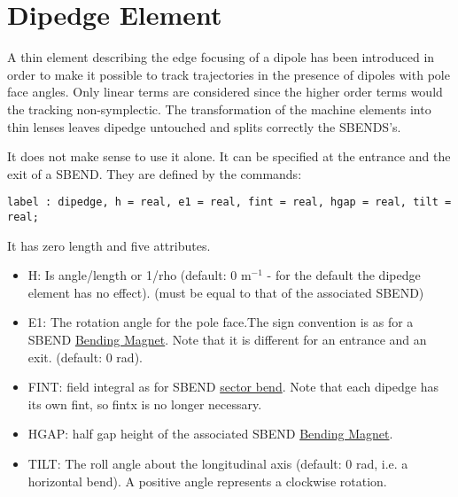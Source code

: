 
\section{Dipedge Element}

A thin element describing the edge focusing of a dipole has been
introduced in order to make it possible to track trajectories in the
presence of dipoles with pole face angles. Only linear terms are
considered since the higher order terms would the tracking
non-symplectic. The transformation of the machine elements into thin
lenses leaves dipedge untouched and splits correctly the SBENDS's.  

It does not make sense to use it alone. It can be specified at the
entrance and the exit of a SBEND. They are defined by the commands:  
\begin{verbatim}
label : dipedge, h = real, e1 = real, fint = real, hgap = real, tilt = real;
\end{verbatim} 

It has zero length and five attributes. 
\begin{itemize}
   \item H: Is angle/length or 1/rho (default: 0 m$^{-1}$ - for the
     default the dipedge element has no effect). (must be equal to that
     of the associated SBEND)  
   \item E1: The rotation angle for the pole face.The sign convention is
     as for a SBEND \href{bend.html}{Bending Magnet}. Note that it is
     different for an entrance and an exit. (default: 0 rad).  
   \item FINT: field integral as for SBEND
     \href{local_system.html#sbend}{sector bend}. Note that each dipedge
     has its own fint, so fintx is no longer necessary.  
   \item HGAP: half gap height of the associated SBEND
     \href{bend.html}{Bending Magnet}.   
   \item TILT: The roll angle about the longitudinal axis (default: 0
     rad, i.e. a horizontal bend). A positive angle represents a
     clockwise rotation.  
\end{itemize}

